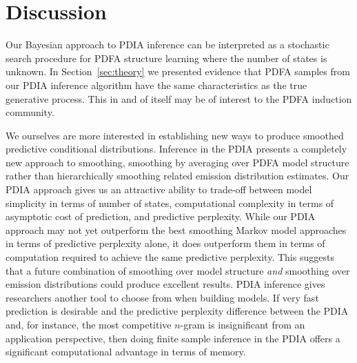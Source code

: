\section{Discussion}
\label{sec:discussion}

Our Bayesian approach to PDIA inference can be interpreted as a stochastic search procedure for PDFA structure learning where the number of states is unknown.  In Section~\ref{sec:theory} we presented evidence that PDFA samples from our PDIA inference algorithm have the same characteristics as the true generative process.  This in and of itself may be of interest to the PDFA induction community.  

We ourselves are more interested in establishing new ways to produce smoothed predictive conditional distributions.  Inference in the PDIA presents a completely new approach to smoothing, smoothing by averaging over PDFA model structure rather than hierarchically smoothing related emission distribution estimates.   Our PDIA approach gives us an attractive ability to trade-off between model simplicity in terms of number of states, computational complexity in terms of asymptotic cost of prediction, and predictive perplexity.  While our PDIA approach may not yet outperform the best smoothing Markov model approaches in terms of predictive perplexity alone, it does outperform them in terms of computation required to achieve the same predictive perplexity.  This suggests that a future combination of smoothing over model structure {\em and} smoothing over emission distributions could produce excellent results.  PDIA inference gives researchers another tool to choose from when building models.  If very fast prediction is desirable and the predictive perplexity difference between the PDIA and, for instance, the most competitive $n$-gram is insignificant from an application perspective, then doing finite sample inference in the PDIA offers a significant computational advantage in terms of memory.

